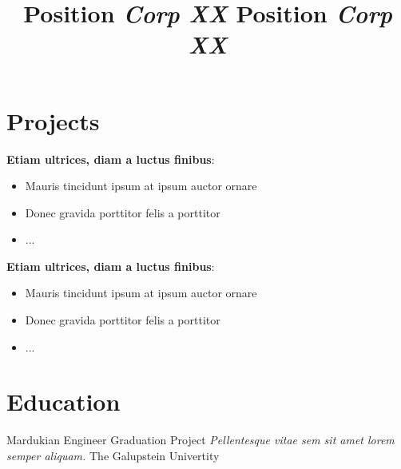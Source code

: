 \documentclass[overlapped,line,final]{res}
\begin{document}
\begin{resume}
\section{\sc Projects } %
\vspace{0.5cm}
\title{\bf Position
	\newline \em Corp XX
}
\begin{position}
	\textbf{Etiam ultrices, diam a luctus finibus}:
	\begin{itemize}
		\item Mauris tincidunt ipsum at ipsum auctor ornare
		\item Donec gravida porttitor felis a porttitor		
		\item ...
	\end{itemize}
\end{position}
\title{\bf Position
	\newline \em Corp XX
}
\begin{position}
	\textbf{Etiam ultrices, diam a luctus finibus}:
	\begin{itemize}
		\item Mauris tincidunt ipsum at ipsum auctor ornare
		\item Donec gravida porttitor felis a porttitor		
		\item ...
	\end{itemize}
\end{position}



\section{\sc Education}
\vspace{0.5cm}
Mardukian Engineer 
\newline Graduation Project \textit{Pellentesque vitae sem sit amet lorem semper aliquam.}
\newline The Galupstein Univertity
\vspace{0.25cm}


\end{resume}
\end{document}
